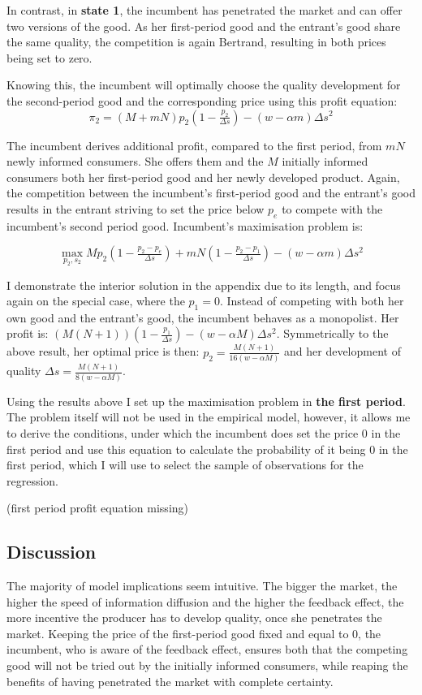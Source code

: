\documentclass{article}
\numberwithin{figure}{section}
\numberwithin{table}{section}
\theoremstyle{indented}
\numberwithin{equation}{section} %
\begin{document}
In contrast, in \textbf{state 1}, the incumbent has penetrated the market and can offer two versions of the good. As her first-period good and the entrant's good share the same quality, the competition is again Bertrand, resulting in both prices being set to zero.

Knowing this, the incumbent will optimally choose the quality development for the second-period good and the corresponding price using this profit equation:
$$\pi_2 =  (M+mN)p_2(1-\tfrac{p_2}{\Delta s}) - (w-\alpha m)\Delta s^2$$

The incumbent derives additional profit, compared to the first period, from $mN$ newly informed consumers. She offers them and the $M$ initially informed consumers both her first-period good and her newly developed product. Again, the competition between the incumbent's first-period good and the entrant's good results in the entrant striving to set the price below $p_e$ to compete with the incumbent's second period good. Incumbent's maximisation problem is:

$$\max_{p_2, s_2}   Mp_2(1-\tfrac{p_2 - p_e}{\Delta s}) + mN(1-\tfrac{p_2 - p_1}{\Delta s}) - (w-\alpha m)\Delta s^2$$

I demonstrate the interior solution in the appendix due to its length, and focus again on the special case, where the $p_1 = 0$. Instead of competing with both her own good and the entrant's good, the incumbent behaves as a monopolist. Her profit is: $(M(N+1))(1-\tfrac{p_1}{\Delta s})-(w-\alpha M)\Delta s^2$. Symmetrically to the above result, her optimal price is then: $p_2 = \tfrac{M(N+1)}{16(w-\alpha M)}$ and her development of quality $\Delta s = \tfrac{M(N+1)}{8(w-\alpha M)}$.

Using the results above I set up the maximisation problem in \textbf{the first period}. The problem itself will not be used in the empirical model, however, it allows me to derive the conditions, under which the incumbent does set the price 0 in the first period and use this equation to calculate the probability of it being 0 in the first period, which I will use to select the sample of observations for the regression. 

(first period profit equation missing)

\subsection{Discussion}\label{intuition}

The majority of model implications seem intuitive. The bigger the market, the higher the speed of information diffusion and the higher the feedback effect, the more incentive the producer has to develop quality, once she penetrates the market. Keeping the price of the first-period good fixed and equal to 0, the incumbent, who is aware of the feedback effect, ensures both that the competing good will not be tried out by the initially informed consumers, while reaping the benefits of having penetrated the market with complete certainty. 
\end{document}
